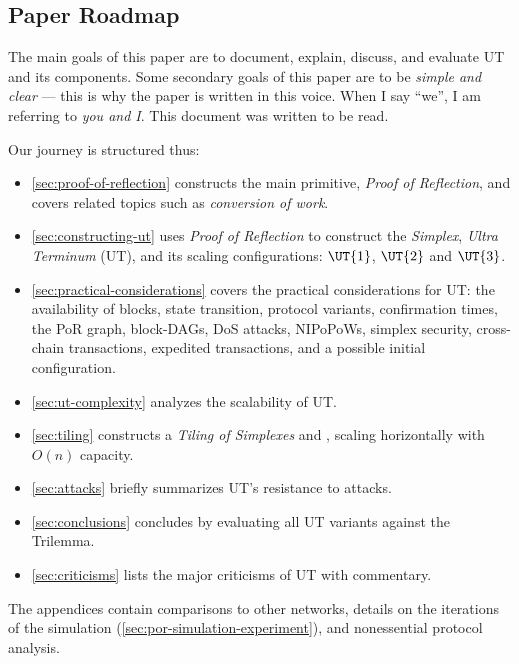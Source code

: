 \subsection{Paper Roadmap}

The main goals of this paper are to document, explain, discuss, and evaluate UT and its components.
Some secondary goals of this paper are to be \emph{simple and clear} --- this is why the paper is written in this voice.
When I say ``we'', I am referring to \emph{you and I}.
This document was written to be read.

Our journey is structured thus:
\begin{itemize}
  \item \autoref{sec:proof-of-reflection} constructs the main primitive, \emph{Proof of Reflection}, and covers related topics such as \emph{conversion of work}.
  \item \autoref{sec:constructing-ut} uses \emph{Proof of Reflection} to construct the \emph{Simplex}, \emph{Ultra Terminum} (UT), and its scaling configurations: $\UT{1}$, $\UT{2}$ and $\UT{3}$.
  \item \autoref{sec:practical-considerations} covers the practical considerations for UT: the availability of blocks, state transition, protocol variants, confirmation times, the PoR graph, block-DAGs, DoS attacks, NIPoPoWs, simplex security, cross-chain transactions, expedited transactions, and a possible initial configuration.
  \item \autoref{sec:ut-complexity} analyzes the scalability of UT.
  \item \autoref{sec:tiling} constructs a \emph{Tiling of Simplexes} and \UTinf{}, scaling horizontally with $O(n)$ capacity.
  \item \autoref{sec:attacks} briefly summarizes UT's resistance to attacks.
  \item \autoref{sec:conclusions} concludes by evaluating all UT variants against the Trilemma.
  \item \autoref{sec:criticisms} lists the major criticisms of UT with commentary.
\end{itemize}

The appendices contain comparisons to other networks, details on the iterations of the simulation (\autoref{sec:por-simulation-experiment}), and nonessential protocol analysis.
